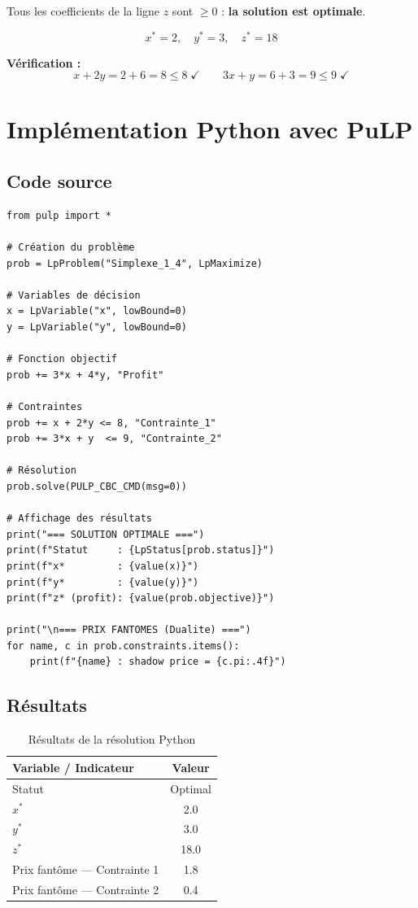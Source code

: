 \documentclass[12pt,a4paper]{article}
\begin{document}
Tous les coefficients de la ligne $z$ sont $\geq 0$ : 
\textbf{la solution est optimale}.

\[
  \boxed{x^* = 2, \quad y^* = 3, \quad z^* = 18}
\]

\textbf{Vérification :}
\[
  x + 2y = 2 + 6 = 8 \leq 8 \;\checkmark \qquad 
  3x + y = 6 + 3 = 9 \leq 9 \;\checkmark
\]

\section{Implémentation Python avec PuLP}

\subsection{Code source}

\begin{lstlisting}[caption={Résolution du problème par PuLP}]
from pulp import *

# Création du problème
prob = LpProblem("Simplexe_1_4", LpMaximize)

# Variables de décision
x = LpVariable("x", lowBound=0)
y = LpVariable("y", lowBound=0)

# Fonction objectif
prob += 3*x + 4*y, "Profit"

# Contraintes
prob += x + 2*y <= 8, "Contrainte_1"
prob += 3*x + y  <= 9, "Contrainte_2"

# Résolution
prob.solve(PULP_CBC_CMD(msg=0))

# Affichage des résultats
print("=== SOLUTION OPTIMALE ===")
print(f"Statut     : {LpStatus[prob.status]}")
print(f"x*         : {value(x)}")
print(f"y*         : {value(y)}")
print(f"z* (profit): {value(prob.objective)}")

print("\n=== PRIX FANTOMES (Dualite) ===")
for name, c in prob.constraints.items():
    print(f"{name} : shadow price = {c.pi:.4f}")
\end{lstlisting}

\subsection{Résultats}

\begin{table}[H]
\centering
\caption{Résultats de la résolution Python}
\begin{tabular}{lc}
\toprule
\textbf{Variable / Indicateur} & \textbf{Valeur} \\
\midrule
Statut & Optimal \\
$x^*$ & 2.0 \\
$y^*$ & 3.0 \\
$z^*$ & 18.0 \\
Prix fantôme — Contrainte 1 & 1.8 \\
Prix fantôme — Contrainte 2 & 0.4 \\
\bottomrule
\end{tabular}
\end{table}
\end{document}
